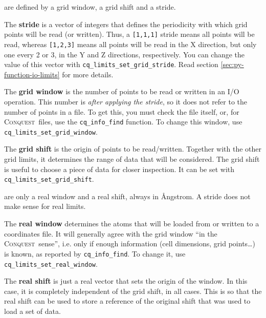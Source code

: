 \documentclass[a4paper,notitlepage,11pt]{article}
\def\CQ{\textsc{Conquest}}
\begin{document}
\vspace{10pt}
 are defined by a grid window, a grid shift and a
stride.
\vspace{5pt}

The {\bf stride} is a vector of integers that defines the periodicity with which
grid points will be read (or written). Thus, a \texttt{[1,1,1]} stride means all
points will be read, whereas \texttt{[1,2,3]} means all points will be read in the X direction, but only one
every 2 or 3, in the Y and Z directions, respectively. You can change the value
of this vector with \texttt{cq\_limits\_set\_grid\_stride}. Read section
\ref{sec:py-function-io-limits} for more details.

The {\bf grid window} is the number of points to be read or written in an I/O
operation. This number is \emph{after applying the stride}, so it does not refer
to the number of points in a file. To get this, you must check the file itself,
or, for \CQ\ files, use the \texttt{cq\_info\_find} function. To change this
window, use \texttt{cq\_limits\_set\_grid\_window}.

The {\bf grid shift} is the origin of points to be read/written. Together with
the other grid limits, it determines the range of data that will be considered.
The grid shift is useful to choose a piece of data for closer inspection. It can
be set with \texttt{cq\_limits\_set\_grid\_shift}.

\vspace{10pt}
 are only a real window and a real shift, always in
\AA ngstrom. A stride does not make sense for real limits.
\vspace{5pt}

The {\bf real window} determines the atoms that will be loaded from or written
to a coordinates file. It will generally agree with the grid window ``in the \CQ\
sense'', i.e. only if enough information (cell dimensions, grid points\ldots) is
known, as reported by \texttt{cq\_info\_find}. To change it, use
\texttt{cq\_limits\_set\_real\_window}.

The {\bf real shift} is just a real vector that sets the origin of the window.
In this case, it is completely independent of the grid shift, in all cases. This
is so that the real shift can be used to store a reference of the original shift
that was used to load a set of data. 
\end{document}
